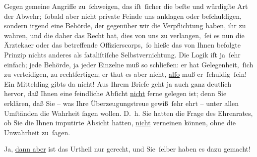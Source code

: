 \pstart
           Gegen gemeine Angriffe zu ſchweigen, das iſt ſicher die beſte und würdigſte Art der
               Abwehr; ſobald aber nicht private Feinde uns anklagen oder beſchuldigen, sondern
               irgend eine Behörde, der gegenüber wir die Verpflichtung haben, ihr \label{K_L04321-8v}\label{K_L04321-8} zu
               wahren, und die daher das Recht hat, dies von uns zu verlangen, ſei es nun die
                  Ärzteka{\geminationm}er oder das betreffende Offizierscorps, ſo
               hieße das von Ihnen befolgte Prinzip nichts anderes als fataliſtiſche
               Selbstvernichtung. Die Logik iſt ja ſehr einfach; jede Behörde, ja jeder Einzelne muß
               so schließen: er hat Gelegenheit, ſich zu verteidigen, zu rechtfertigen; er thut es
               aber nicht, \uline{alſo} muß er ſchuldig ſein! Ein Mittelding
               gibts da nicht! Aus Ihrem Briefe geht ja auch ganz {\pb}deutlich hervor,
               daß Ihnen eine feindliche Abſicht \uline{nicht} ferne gelegen
               ist; denn Sie erklären, daß Sie – was Ihre Überzeugungstreue gewiß ſehr ehrt – unter
               allen Umſtänden die Wahrheit{ }ſagen wollen. D. h. Sie hatten die Frage des Ehrenrates, ob Sie die Ihnen imputirte Absicht
               hatten, \uline{nicht} verneinen können, ohne die Unwahrheit
               zu ſagen.\pend
           
\pstart
           Ja, \uline{dann aber} ist das Urtheil nur gerecht, und
               Sie ſelber haben es dazu gemacht!\pend
           
